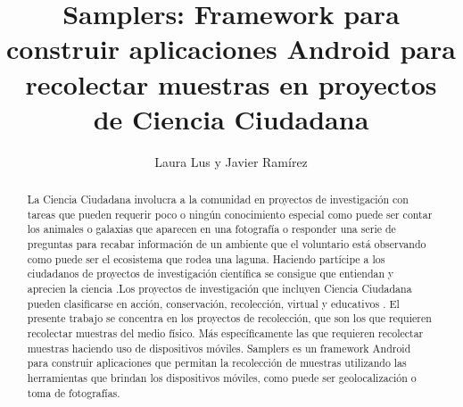 \documentclass[11pt]{report}
\title{Samplers: Framework para construir aplicaciones Android para recolectar muestras en proyectos de Ciencia Ciudadana}
\author{Laura Lus y Javier Ramírez}
\begin{document}
\maketitle

\begin{abstract}

La Ciencia Ciudadana involucra a la comunidad en proyectos de investigación con tareas que pueden requerir poco o ningún conocimiento especial como puede ser contar los animales o galaxias que aparecen en una fotografía o responder una serie de preguntas para recabar información de un ambiente que el voluntario está observando como puede ser el ecosistema que rodea una laguna. Haciendo partícipe a los ciudadanos de proyectos de investigación científica se consigue que entiendan y aprecien la ciencia \cite{silvertown2009new}.Los proyectos de investigación que incluyen Ciencia Ciudadana pueden clasificarse en acción, conservación, recolección, virtual y educativos \cite{wiggins2011conservation}. El presente trabajo se concentra en los proyectos de recolección, que son los que requieren recolectar muestras del medio físico. Más específicamente las que requieren recolectar muestras haciendo uso de dispositivos móviles. Samplers es un framework Android para construir aplicaciones que permitan la recolección de muestras utilizando las herramientas que brindan los dispositivos móviles, como puede ser geolocalización o toma de fotografías.

\end{abstract}

\tableofcontents











\end{document}
